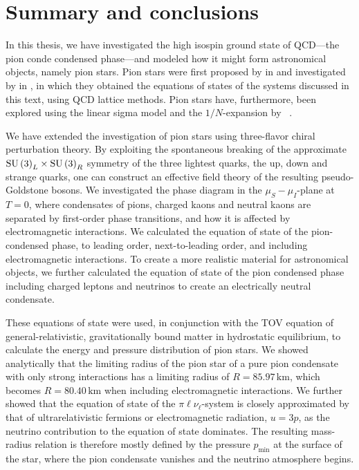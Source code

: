 \section{Summary and conclusions}


In this thesis, we have investigated the high isospin ground state of QCD---the pion conde condensed phase---and modeled how it might form astronomical objects, namely pion stars.
Pion stars were first proposed by \citeauthor{carignanoScrutinizingPionCondensed2017} in \autocite{carignanoScrutinizingPionCondensed2017} and investigated by \citeauthor{brandtNewClassCompact2018} in \autocite{brandtNewClassCompact2018}, in which they obtained the equations of states of the systems discussed in this text, using QCD lattice methods.
Pion stars have, furthermore, been explored using the linear sigma model and the $1/N$-expansion by \citeauthor{andersenBoseEinsteinCondensationPion2018}~\autocite{andersenBoseEinsteinCondensationPion2018}.

We have extended the investigation of pion stars using three-flavor chiral perturbation theory.
By exploiting the spontaneous breaking of the approximate $\text{SU}\left(3\right)_L\times\text{SU}\left(3\right)_R$ symmetry of the three lightest quarks, the up, down and strange quarks, one can construct an effective field theory of the resulting pseudo-Goldstone bosons.
We investigated the phase diagram in the $\mu_S-\mu_I$-plane at $T = 0$, where condensates of pions, charged kaons and neutral kaons are separated by first-order phase transitions, and how it is affected by electromagnetic interactions.
We calculated the equation of state of the pion-condensed phase, to leading order, next-to-leading order, and including electromagnetic interactions.
To create a more realistic material for astronomical objects, we further calculated the equation of state of the pion condensed phase including charged leptons and neutrinos to create an electrically neutral condensate.

These equations of state were used, in conjunction with the TOV equation of general-relativistic, gravitationally bound matter in hydrostatic equilibrium, to calculate the energy and pressure distribution of pion stars.
We showed analytically that the limiting radius of the pion star of a pure pion condensate with only strong interactions has a limiting radius of $R = 85.97\,\text{km}$, which becomes $R = 80.40\,\text{km}$ when including electromagnetic interactions.
We further showed that the equation of state of the $\pi\ell\nu_\ell$-system is closely approximated by that of ultrarelativistic fermions or electromagnetic radiation, $u = 3p$, as the neutrino contribution to the equation of state dominates.
The resulting mass-radius relation is therefore mostly defined by the pressure $p_\text{min}$ at the surface of the star, where the pion condensate vanishes and the neutrino atmosphere begins.

